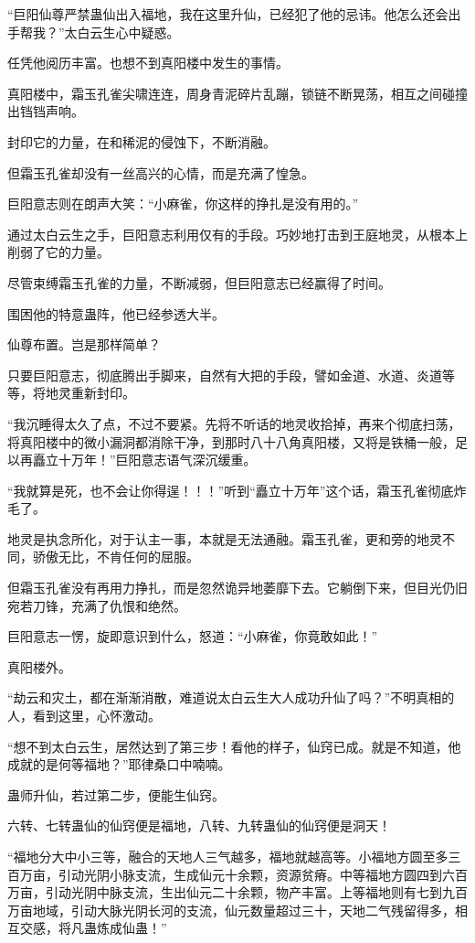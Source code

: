\begin{this_body}
“巨阳仙尊严禁蛊仙出入福地，我在这里升仙，已经犯了他的忌讳。他怎么还会出手帮我？”太白云生心中疑惑。

任凭他阅历丰富。也想不到真阳楼中发生的事情。

真阳楼中，霜玉孔雀尖啸连连，周身青泥碎片乱蹦，锁链不断晃荡，相互之间碰撞出铛铛声响。

封印它的力量，在和稀泥的侵蚀下，不断消融。

但霜玉孔雀却没有一丝高兴的心情，而是充满了惶急。

巨阳意志则在朗声大笑：“小麻雀，你这样的挣扎是没有用的。”

通过太白云生之手，巨阳意志利用仅有的手段。巧妙地打击到王庭地灵，从根本上削弱了它的力量。

尽管束缚霜玉孔雀的力量，不断减弱，但巨阳意志已经赢得了时间。

围困他的特意蛊阵，他已经参透大半。

仙尊布置。岂是那样简单？

只要巨阳意志，彻底腾出手脚来，自然有大把的手段，譬如金道、水道、炎道等等，将地灵重新封印。

“我沉睡得太久了点，不过不要紧。先将不听话的地灵收拾掉，再来个彻底扫荡，将真阳楼中的微小漏洞都消除干净，到那时八十八角真阳楼，又将是铁桶一般，足以再矗立十万年！”巨阳意志语气深沉缓重。

“我就算是死，也不会让你得逞！！！”听到“矗立十万年”这个话，霜玉孔雀彻底炸毛了。

地灵是执念所化，对于认主一事，本就是无法通融。霜玉孔雀，更和旁的地灵不同，骄傲无比，不肯任何的屈服。

但霜玉孔雀没有再用力挣扎，而是忽然诡异地萎靡下去。它躺倒下来，但目光仍旧宛若刀锋，充满了仇恨和绝然。

巨阳意志一愣，旋即意识到什么，怒道：“小麻雀，你竟敢如此！”

真阳楼外。

“劫云和灾土，都在渐渐消散，难道说太白云生大人成功升仙了吗？”不明真相的人，看到这里，心怀激动。

“想不到太白云生，居然达到了第三步！看他的样子，仙窍已成。就是不知道，他成就的是何等福地？”耶律桑口中喃喃。

蛊师升仙，若过第二步，便能生仙窍。

六转、七转蛊仙的仙窍便是福地，八转、九转蛊仙的仙窍便是洞天！

“福地分大中小三等，融合的天地人三气越多，福地就越高等。小福地方圆至多三百万亩，引动光阴小脉支流，生成仙元十余颗，资源贫瘠。中等福地方圆四到六百万亩，引动光阴中脉支流，生出仙元二十余颗，物产丰富。上等福地则有七到九百万亩地域，引动大脉光阴长河的支流，仙元数量超过三十，天地二气残留得多，相互交感，将凡蛊炼成仙蛊！”


\end{this_body}
